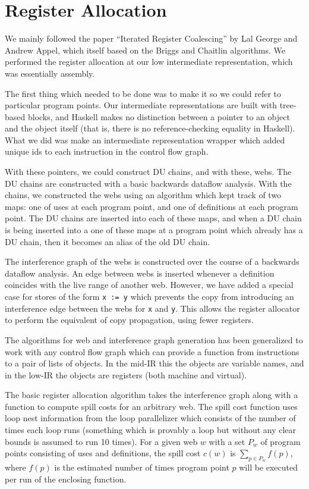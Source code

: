 \documentclass[11pt]{article}
\begin{document}
\section {Register Allocation}

We mainly followed the paper ``Iterated Register Coalescing'' by Lal
George and Andrew Appel, which itself based on the Briggs and Chaitlin
algorithms.  We performed the register allocation at our low
intermediate representation, which was essentially assembly.

The first thing which needed to be done was to make it so we could
refer to particular program points.  Our intermediate representations
are built with tree-based blocks, and Haskell makes no distinction
between a pointer to an object and the object itself (that is, there
is no reference-checking equality in Haskell).  What we did was make
an intermediate representation wrapper which added unique ids to each
instruction in the control flow graph.

With these pointers, we could construct DU chains, and with these,
webs.  The DU chains are constructed with a basic backwards dataflow
analysis.  With the chains, we constructed the webs using an algorithm
which kept track of two maps: one of uses at each program point, and
one of definitions at each program point.  The DU chains are inserted
into each of these maps, and when a DU chain is being inserted into a
one of these maps at a program point which already has a DU chain,
then it becomes an alias of the old DU chain.

The interference graph of the webs is constructed over the course of a
backwards dataflow analysis.  An edge between webs is inserted
whenever a definition coincides with the live range of another web.
However, we have added a special case for stores of the form \texttt{x
  := y} which prevents the copy from introducing an interference edge
between the webs for \texttt{x} and \texttt{y}.  This allows the
register allocator to perform the equivalent of copy propagation,
using fewer registers.

The algorithms for web and interference graph generation has been
generalized to work with any control flow graph which can provide a
function from instructions to a pair of lists of objects.  In the
mid-IR this the objects are variable names, and in the low-IR the
objects are registers (both machine and virtual).

The basic register allocation algorithm takes the interference graph
along with a function to compute spill costs for an arbitrary web.
The spill cost function uses loop nest information from the loop
parallelizer which consists of the number of times each loop runs
(something which is provably a loop but without any clear bounds is
assumed to run 10 times).  For a given web $w$ with a set $P_w$ of
program points consisting of uses and definitions, the spill cost
$c(w)$ is $\sum_{p\in P_w} f(p)$, where $f(p)$ is the estimated number
of times program point $p$ will be executed per run of the enclosing
function.
\end{document}

